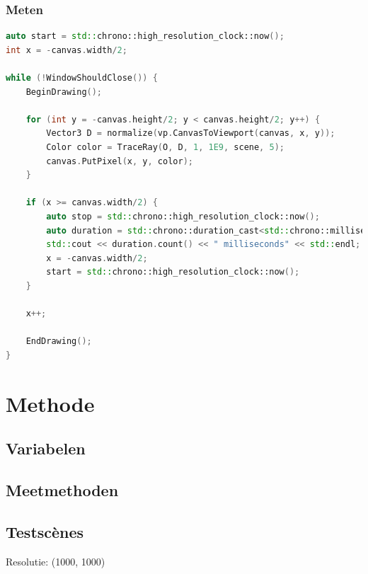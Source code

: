\documentclass[12pt, a4paper]{article}
\begin{document}
\subsubsection{Meten}
\begin{lstlisting}[language=c++]
auto start = std::chrono::high_resolution_clock::now();
int x = -canvas.width/2;

while (!WindowShouldClose()) {
	BeginDrawing();

	for (int y = -canvas.height/2; y < canvas.height/2; y++) {
		Vector3 D = normalize(vp.CanvasToViewport(canvas, x, y));
		Color color = TraceRay(O, D, 1, 1E9, scene, 5);
		canvas.PutPixel(x, y, color);
	}
	
	if (x >= canvas.width/2) {
		auto stop = std::chrono::high_resolution_clock::now();
		auto duration = std::chrono::duration_cast<std::chrono::milliseconds>(stop - start);
		std::cout << duration.count() << " milliseconds" << std::endl;
		x = -canvas.width/2;
		start = std::chrono::high_resolution_clock::now();
	}
	
	x++;
	
	EndDrawing();
}
\end{lstlisting}

\clearpage
\section{Methode}
\subsection{Variabelen}
\subsection{Meetmethoden}
\subsection{Testscènes}
Resolutie: (1000, 1000)
\end{document}
